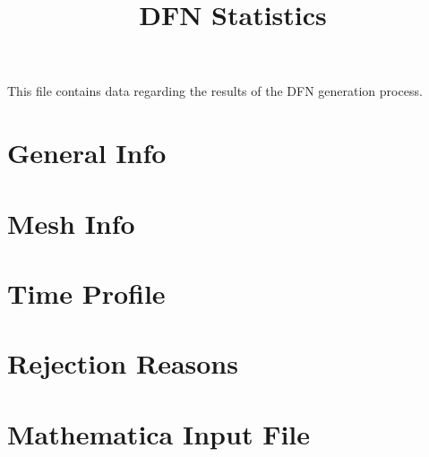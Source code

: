 \documentclass[a4paper,11pt]{article}
\title{DFN Statistics}
\begin{document}
\maketitle 
\begin{framed}
\begin{center}

\end{center}
\end{framed}This file contains data regarding the results of the DFN generation process.

\begingroup
\def\addvspace#1{}
\tableofcontents
\endgroup

\section{General Info}


\section{Mesh Info}


\section{Time Profile}




\section{Rejection Reasons}




\newpage
\section{Mathematica Input File}

\end{document}
